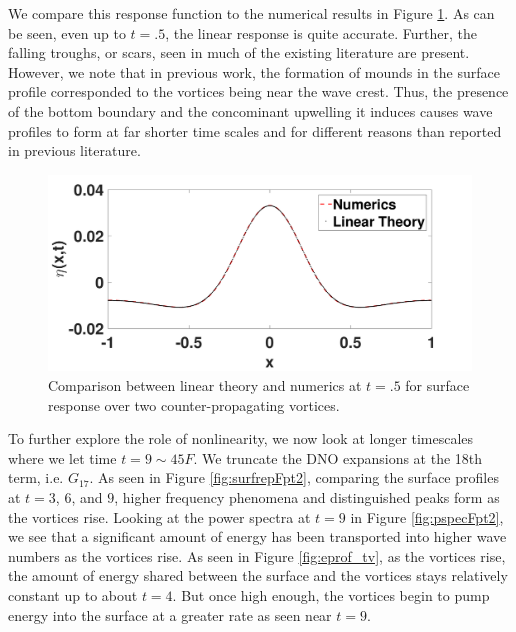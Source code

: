 \documentclass[a4paper,11pt]{article}
\begin{document}
We compare this response function to the numerical results in Figure \ref{fig:linrep}.  As can be seen, even up to $t=.5$, the linear response is quite accurate.  Further, the falling troughs, or scars, seen in much of the existing literature \cite{marcus,tryggvason} are present.  However, we note that in previous work, the formation of mounds in the surface profile corresponded to the vortices being near the wave crest.  Thus, the presence of the bottom boundary and the concominant upwelling it induces causes wave profiles to form at far shorter time scales and for different reasons than reported in previous literature.  
\begin{figure}[!h]
\centering
\includegraphics[width=.75\textwidth]{lin_response_tf_pt5}
\caption{Comparison between linear theory and numerics at $t=.5$ for surface response over two counter-propagating vortices.}
\label{fig:linrep}
\end{figure}

To further explore the role of nonlinearity, we now look at longer timescales where we let time $t = 9 \sim 45 F$.  We truncate the DNO expansions at the 18th term, i.e. $G_{17}$.  As seen in Figure \ref{fig:surfrepFpt2}, comparing the surface profiles at $t=3$, $6$, and $9$, higher frequency phenomena and distinguished peaks form as the vortices rise.  Looking at the power spectra at $t=9$ in Figure \ref{fig:pspecFpt2}, we see that a significant amount of energy has been transported into higher wave numbers as the vortices rise.  As seen in Figure \ref{fig:eprof_tv}, as the vortices rise, the amount of energy shared between the surface and the vortices stays relatively constant up to about $t=4$.  But once high enough, the vortices begin to pump energy into the surface at a greater rate as seen near $t=9$.
\end{document}
